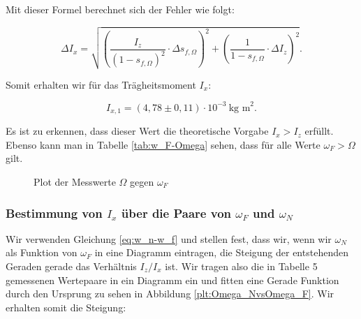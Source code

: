 \documentclass{article}
\begin{document}
Mit dieser Formel berechnet sich der Fehler wie folgt:

\begin{equation}
    \Delta I_x = \sqrt{\left( \frac{I_z}{(1-s_{f,\Omega})^2} \cdot \Delta s_{f,\Omega} \right)^2 + \left( \frac{1}{1-s_{f,\Omega}} \cdot \Delta I_z \right)^2}.
\end{equation}

Somit erhalten wir für das Trägheitsmoment $I_x$:

\begin{equation}
    I_{x,1} = (4,78 \pm 0,11) \cdot 10^{-3} \ \text{kg m}^2.
\end{equation}

Es ist zu erkennen, dass dieser Wert die theoretische Vorgabe $I_x > I_z$ erfüllt. Ebenso kann man in Tabelle \ref{tab:w_F-Omega} sehen, dass für alle Werte $\omega_F > \Omega$ gilt.

\begin{figure}[!hp]
    \centering
    \caption{Plot der Messwerte $\Omega$ gegen $\omega_F$}
    \label{plt:OMEGAvsOmega_F}
\end{figure}

\clearpage
\newpage
\subsubsection{Bestimmung von $I_x$ über die Paare von $\omega_F$ und $\omega_N$}

Wir verwenden Gleichung \ref{eq:w_n-w_f} und stellen fest, dass wir, wenn wir $\omega_N$ als Funktion von $\omega_F$ in eine Diagramm eintragen, die Steigung der entstehenden Geraden gerade das Verhältnis $I_z/I_x$ ist. Wir tragen also die in Tabelle 5 gemessenen Wertepaare in ein Diagramm ein und fitten eine Gerade Funktion durch den Ursprung zu sehen in Abbildung \ref{plt:Omega_NvsOmega_F}. Wir erhalten somit die Steigung:
\end{document}
